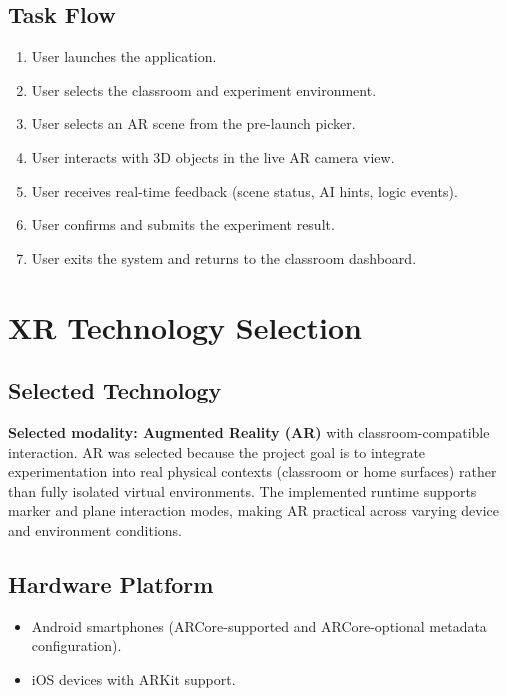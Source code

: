 \documentclass[12pt,a4paper]{article}
\begin{document}
\subsection{Task Flow}

\begin{enumerate}[leftmargin=1.4cm]
  \item User launches the application.
  \item User selects the classroom and experiment environment.
  \item User selects an AR scene from the pre-launch picker.
  \item User interacts with 3D objects in the live AR camera view.
  \item User receives real-time feedback (scene status, AI hints, logic events).
  \item User confirms and submits the experiment result.
  \item User exits the system and returns to the classroom dashboard.
\end{enumerate}

\section{XR Technology Selection}

\subsection{Selected Technology}

\textbf{Selected modality: Augmented Reality (AR)} with classroom-compatible interaction.
AR was selected because the project goal is to integrate experimentation into real
physical contexts (classroom or home surfaces) rather than fully isolated virtual
environments. The implemented runtime supports marker and plane interaction modes, making
AR practical across varying device and environment conditions.

\subsection{Hardware Platform}

\begin{itemize}[leftmargin=1.4cm]
  \item Android smartphones (ARCore-supported and ARCore-optional metadata configuration).
  \item iOS devices with ARKit support.
\end{itemize}
\end{document}
